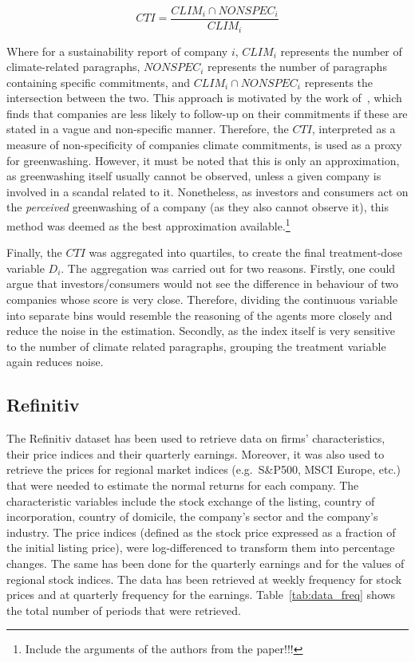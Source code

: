 \documentclass[12pt]{article}
\begin{document}
\begin{equation}\label{eq:cti}
    CTI = \frac{CLIM_i \cap NONSPEC_i}{CLIM_{i}}
\end{equation}

Where for a sustainability report of company $i$, $CLIM_i$ represents the number of climate-related paragraphs, $NONSPEC_i$ represents the number of paragraphs containing specific commitments, and $CLIM_i \cap NONSPEC_i$ represents the intersection between the two. 
This approach is motivated by the work of\ \cite{coen_are_2022}, which finds that companies are less likely to follow-up on their commitments if these are stated in a vague and non-specific manner. Therefore, the $CTI$, interpreted as a measure of non-specificity of companies climate commitments, is used as a proxy for greenwashing. However, it must be noted that this is only an approximation, as greenwashing itself usually cannot be observed, unless a given company is involved in a scandal related to it. Nonetheless, as investors and consumers act on the \textit{perceived} greenwashing of a company (as they also cannot observe it), this method was deemed as the best approximation available.\footnote{Include the arguments of the authors from the paper!!!}  

Finally, the $CTI$ was aggregated into quartiles, to create the final treatment-dose variable $D_i$. The aggregation was carried out for two reasons. Firstly, one could argue that investors/consumers would not see the difference in behaviour of two companies whose score is very close. Therefore, dividing the continuous variable into separate bins would resemble the reasoning of the agents more closely and reduce the noise in the estimation. Secondly, as the index itself is very sensitive to the number of climate related paragraphs, grouping the treatment variable again reduces noise. 



\subsection{Refinitiv}

The Refinitiv dataset has been used to retrieve data on firms' characteristics, their price indices and their quarterly earnings. Moreover, it was also used to retrieve the prices for regional market indices (e.g.\ S\&P500, MSCI Europe, etc.) that were needed to estimate the normal returns for each company. The characteristic variables include the stock exchange of the listing, country of incorporation, country of domicile, the company's sector and the company's industry. The price indices (defined as the stock price expressed as a fraction of the initial listing price), were log-differenced to transform them into percentage changes. The same has been done for the quarterly earnings and for the values of regional stock indices. The data has been retrieved at weekly frequency for stock prices and at quarterly frequency for the earnings. Table~\ref{tab:data_freq} shows the total number of periods that were retrieved.
\end{document}
